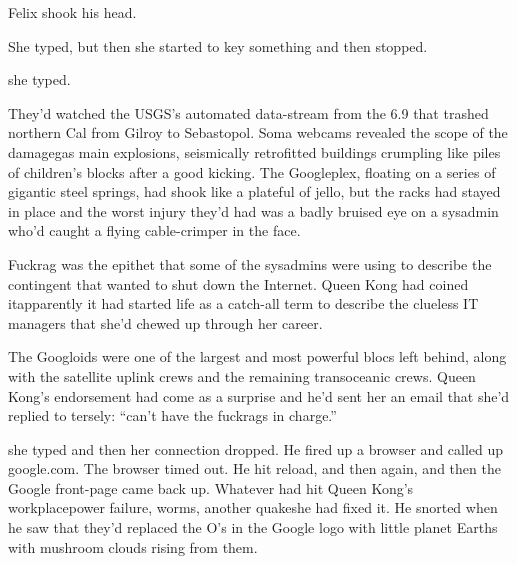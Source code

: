 Felix shook his head.

She typed, but then she started to key something and then stopped.

she typed.


They’d watched the USGS’s automated data-stream from the 6.9 that
trashed northern Cal from Gilroy to Sebastopol. Soma webcams
revealed the scope of the damage\dash{}gas main explosions, seismically
retrofitted buildings crumpling like piles of children’s blocks
after a good kicking. The Googleplex, floating on a series of
gigantic steel springs, had shook like a plateful of jello, but the
racks had stayed in place and the worst injury they’d had was a
badly bruised eye on a sysadmin who’d caught a flying cable-crimper
in the face.

Fuckrag was the epithet that some of the sysadmins were using to
describe the contingent that wanted to shut down the Internet.
Queen Kong had coined it\dash{}apparently it had started life as a
catch-all term to describe the clueless IT managers that she’d
chewed up through her career.

The Googloids were one of the largest and most powerful blocs left
behind, along with the satellite uplink crews and the remaining
transoceanic crews. Queen Kong’s endorsement had come as a surprise
and he’d sent her an email that she’d replied to tersely: “can’t
have the fuckrags in charge.”

she typed and then her connection dropped. He fired up a browser
and called up google.com. The browser timed out. He hit reload, and
then again, and then the Google front-page came back up. Whatever
had hit Queen Kong’s workplace\dash{}power failure, worms, another
quake\dash{}she had fixed it. He snorted when he saw that they’d replaced
the O’s in the Google logo with little planet Earths with mushroom
clouds rising from them.

